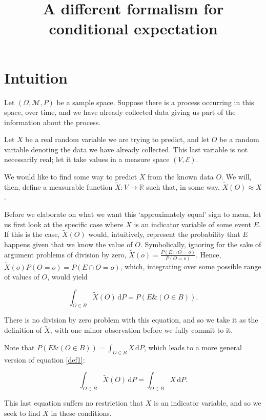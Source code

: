 \documentclass{article}
\title{A different formalism for conditional expectation}
\author{}
\date{}
\let\mathbbalt\mathbb
\let\mathbb\mathbbalt
\newcommand{\M}{\mathcal{M}}
\newcommand{\E}{\mathcal{E}}
\newcommand{\R}{\mathbb{R}}
\newcommand{\dd}{\,\mathrm{d}}
\newcommand{\amp}{\mathbin{\&}}
\begin{document}
	\maketitle
	
	\section{Intuition}
	
	Let $(\Omega, \M, P)$ be a sample space. Suppose there is a process occurring in this space, over time, and we have already collected data giving us part of the information about the process.
	
	Let $X$ be a real random variable we are trying to predict, and let $O$ be a random variable denoting the data we have already collected. This last variable is not necessarily real; let it take values in a measure space $(V, \E)$.
	
	We would like to find some way to predict $X$ from the known data $O$. We will, then, define a measurable function $\tilde X : V \to \R$ such that, in some way, $\tilde X(O)\approx X$.
	
	Before we elaborate on what we want this `approximately equal' sign to mean, let us first look at the specific case where $X$ is an indicator variable of some event $E$. If this is the case, $\tilde X(O)$ would, intuitively, represent the probability that $E$ happens given that we know the value of $O$. Symbolically, ignoring for the sake of argument problems of division by zero, $\tilde X(o) = \frac{P(E \cap O = o)}{P(O = o)}$. Hence, $\tilde X(o) P(O = o) = P(E \cap O = o)$, which, integrating over some possible range of values of $O$, would yield
	
	\begin{equation}\label{def1}
	\int_{O \in B} \tilde X(O) \dd P = P(E \amp (O \in B)).
	\end{equation}
	
	There is no division by zero problem with this equation, and so we take it as the definition of $\tilde X$, with one minor observation before we fully commit to it.
	
	Note that $P(E \amp (O \in B)) = \int_{O \in B} X \dd P$, which leads to a more general version of equation \eqref{def1}:
	
	\begin{equation}\label{def2}
	\int_{O \in B} \tilde X(O) \dd P = \int_{O \in B} X \dd P.
	\end{equation}
	
	This last equation suffers no restriction that $X$ is an indicator variable, and so we seek to find $\tilde X$ in these conditions.
	
\end{document}
